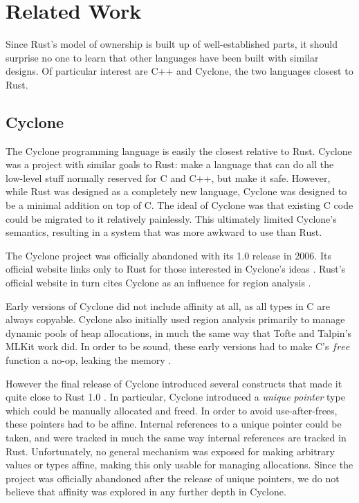\chapter{Related Work}
\label{ch:related}

Since Rust's model of ownership is built up of well-established parts, it should
surprise no one to learn that other languages have been built with similar
designs. Of particular interest are C++ and Cyclone, the two languages closest
to Rust.




\section{Cyclone}

The Cyclone programming language is easily the closest relative to Rust. Cyclone
was a project with similar goals to Rust: make a language that can do all the
low-level stuff normally reserved for C and C++, but make it safe. However, while
Rust was designed as a completely new language, Cyclone was designed to be a
minimal addition on top of C. The ideal of Cyclone was that existing C code
could be migrated to it relatively painlessly. This ultimately limited
Cyclone's semantics, resulting in a system that was more awkward to use than
Rust.

The Cyclone project was officially abandoned with its 1.0 release in 2006.
Its official website links only to Rust for those interested in Cyclone's ideas
\cite{cyclone-web}. Rust's official website in turn cites Cyclone as an
influence for region analysis \cite{rust-stolen}.

Early versions of Cyclone did not include affinity at all, as all types in C
are always copyable. Cyclone also initially used region analysis primarily to
manage dynamic pools of heap allocations, in much the same way that Tofte and Talpin's
MLKit work did. In order to be sound, these early versions had to make C's $free$ function
a no-op, leaking the memory \cite{grossman2002region}.

However the final release of Cyclone introduced several constructs
that made it quite close to Rust 1.0 \cite{swamy2006safe}. In particular, Cyclone introduced
a \emph{unique pointer} type which could be manually allocated and freed. In order
to avoid use-after-frees, these pointers had to be affine. Internal references to a
unique pointer could be taken, and were tracked in much the same way internal references are
tracked in Rust. Unfortunately, no general mechanism was exposed for making arbitrary
values or types affine, making this only usable for managing allocations.
Since the project was officially abandoned after the release of unique pointers, we
do not believe that affinity was explored in any further depth in Cyclone.







